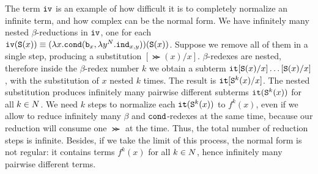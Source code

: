 The term ${\tt iv}$ is an example of how difficult it is to completely normalize
an infinite term, and how complex can be the normal form. 
We have infinitely many nested $\beta$-reductions in
${\tt iv}$, one for each ${\tt iv}({\tt S} (x)) \equiv (\lambda x.{\tt cond} ({\tt b}_x, \lambda y^{N}.{\tt ind}_{x,y}))({\tt S}(x))$.
Suppose we remove all of them in a single step, producing a substitution
$[\Succ (x)/x]$. $\beta$-redexes are nested, therefore 
inside the $\beta$-redex number $k$ we obtain a subterm ${\tt it}[{\tt S} (x)/x]
\ldots[{\tt S} (x)/x]$, with the substitution of $x$ nested $k$ times. 
The result is ${\tt it}[{\tt S} ^k(x)/x]$.
The nested substitution produces infinitely many pairwise different subterms 
${\tt it}({\tt S} ^k(x))$ for all $k \in {N}$. 
We need $k$ steps to normalize each ${\tt it}({\tt S} ^k(x))$ to $f^k(x)$, 
even if we allow to reduce infinitely many 
$\beta$ and ${\tt cond}$-redexes at the same time, because our reduction will consume one 
$\Succ$ at the time. Thus, the total number of reduction steps is infinite. 
Besides, if we take the limit of this process, the normal form is not regular: it contains terms 
$f^k(x)$ for all $k \in {N}$, hence infinitely many pairwise different terms. 






